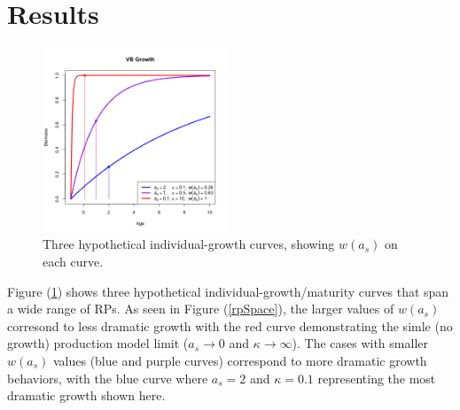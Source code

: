 %
%
%
%


%
%

%
\clearpage
\section{Results}

\begin{figure}
\vspace{-1.5cm}
\includegraphics[width=0.49\textwidth]{../ddBias/vbCurves.png}
\vspace{-1cm}
\caption{Three hypothetical individual-growth curves, showing $w(a_s)$ on each curve.}\label{vbCurves}
\end{figure}
%
Figure (\ref{vbCurves}) shows three hypothetical individual-growth/maturity curves 
that span a wide range of RPs. As seen in Figure (\ref{rpSpace}), the larger values of 
$w(a_s)$ corresond to less dramatic growth with the red curve demonstrating the 
simle (no growth) production model limit ($a_s\rightarrow0$ and $\kappa\rightarrow\infty$). 
The cases with smaller $w(a_s)$ values (blue and purple curves) correspond to more dramatic 
growth behaviors, with the blue curve where $a_s=2$ and $\kappa=0.1$ representing the most 
dramatic growth shown here.


